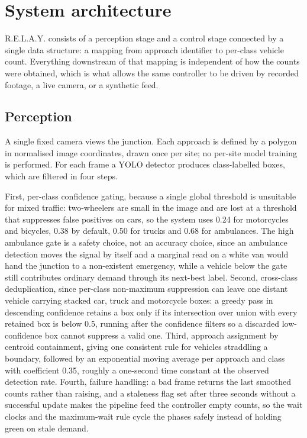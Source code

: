 \documentclass[journal]{IEEEtran}
\newcommand{\relay}{R.E.L.A.Y.}
\begin{document}
\section{System architecture}

\relay{} consists of a perception stage and a control stage connected by a single data structure: a
mapping from approach identifier to per-class vehicle count. Everything downstream of that mapping
is independent of how the counts were obtained, which is what allows the same controller to be
driven by recorded footage, a live camera, or a synthetic feed.

\subsection{Perception}

A single fixed camera views the junction. Each approach is defined by a polygon in normalised image
coordinates, drawn once per site; no per-site model training is performed. For each frame a YOLO
detector produces class-labelled boxes, which are filtered in four steps.

First, per-class confidence gating, because a single global threshold is unsuitable for mixed traffic:
two-wheelers are small in the image and are lost at a threshold that suppresses false positives on cars,
so the system uses 0.24 for motorcycles and bicycles, 0.38 by default, 0.50 for trucks and 0.68 for
ambulances. The high ambulance gate is a safety choice, not an accuracy choice, since an ambulance
detection moves the signal by itself and a marginal read on a white van would hand the junction to a
non-existent emergency, while a vehicle below the gate still contributes ordinary demand through its
next-best label. Second, cross-class deduplication, since per-class non-maximum suppression can leave one
distant vehicle carrying stacked car, truck and motorcycle boxes: a greedy pass in descending confidence
retains a box only if its intersection over union with every retained box is below 0.5, running after the
confidence filters so a discarded low-confidence box cannot suppress a valid one. Third, approach
assignment by centroid containment, giving one consistent rule for vehicles straddling a boundary,
followed by an exponential moving average per approach and class with coefficient 0.35, roughly a
one-second time constant at the observed detection rate. Fourth, failure handling: a bad frame returns the
last smoothed counts rather than raising, and a staleness flag set after three seconds without a
successful update makes the pipeline feed the controller empty counts, so the wait clocks and the
maximum-wait rule cycle the phases safely instead of holding green on stale demand.
\end{document}
